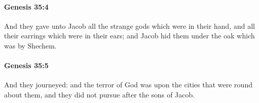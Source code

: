 		\paragraph{Genesis 35:4} %
			\label{GENESIS-35-4}

			And they gave unto Jacob all the strange gods which were in their hand, and all their earrings which were in their ears; and Jacob hid them under the oak which was by Shechem.


		\paragraph{Genesis 35:5} %
			\label{GENESIS-35-5}

			And they journeyed: and the terror of God was upon the cities that were round about them, and they did not pursue after the sons of Jacob.


